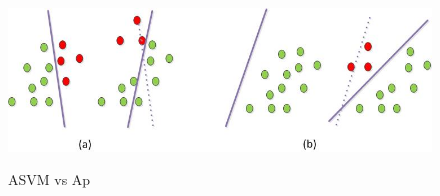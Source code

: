 \begin{figure}
  \centering
  \includegraphics[scale = .6]{fig/domain.jpg}\\
  \caption{ASVM vs Ap}
\end{figure}
